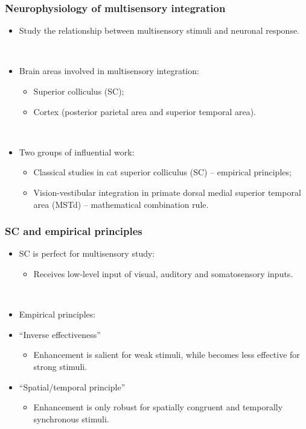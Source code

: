 \documentclass{beamer}
\begin{document}
\begin{frame}
  \frametitle{Neurophysiology of multisensory integration}
  \begin{itemize}
    \item Study the relationship between multisensory stimuli and neuronal response.

    ~
    \item Brain areas involved in multisensory integration:
    \begin{itemize}
      \item Superior colliculus (SC);
      \item Cortex (posterior parietal area and superior temporal area).
    \end{itemize}

    ~
    \item Two groups of influential work:
    \begin{itemize}
      \item Classical studies in cat superior colliculus (SC) -- empirical principles;
      \item Vision-vestibular integration in primate dorsal medial superior temporal area (MSTd) -- mathematical combination rule.
    \end{itemize}
  \end{itemize}
\end{frame}

\begin{frame}
  \frametitle{SC and empirical principles}
  \begin{itemize}
    \item SC is perfect for multisensory study:
    \begin{itemize}
      \item Receives low-level input of visual, auditory and somatosensory inputs.
    \end{itemize}

    ~
    \item Empirical principles:
    \item ``Inverse effectiveness''
    \begin{itemize}
      \item Enhancement is salient for weak stimuli, while becomes less effective for strong stimuli.
    \end{itemize}
    \item ``Spatial/temporal principle''
    \begin{itemize}
      \item Enhancement is only robust for spatially congruent and temporally synchronous stimuli.
    \end{itemize}
  \end{itemize}
\end{frame}
\end{document}

